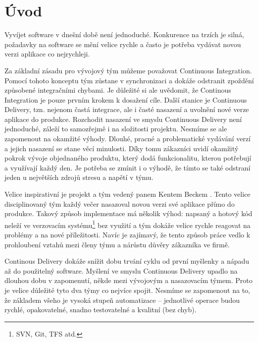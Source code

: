 
\chapter{Úvod}
Vyvíjet software v dnešní době není jednoduché. Konkurence na trzích je silná, požadavky na software se mění velice rychle a často je potřeba vydávat novou verzi aplikace co nejrychleji.

Za základní zásadu pro vývojový tým můžeme považovat Continuous Integration. Pomocí tohoto konceptu tým zůstane v synchronizaci a dokáže odstranit zpoždění způsobené integračními chybami. Je důležité si ale uvědomit, že Continous Integration je pouze prvním krokem k dosažení cíle. Další stanice je Continuous Delivery, tzn. nejenom častá integrace, ale i časté nasazení a uvolnění nové verze aplikace do produkce. Rozchodit nasazení ve smyslu Continuous Delivery není jednoduché, záleží to samozřejmě i na složitosti projektu. Nesmíme se ale zapomenout na okamžité výhody. Dlouhé, pracné a problematické vydávání verzí a jejich nasazení se stane věcí minulosti. Díky tomu zákazníci uvidí okamžitý pokrok vývoje objednaného produktu, který dodá funkcionalitu, kterou potřebují a využívají každý den. Je potřeba se zmínit i o výhodě, že tímto se také odstraní jeden u největších zdrojů stresu a napětí v týmu.

Velice inspirativní je projekt a tým vedený panem Kentem Beckem \cite{ContDelivery}. Tento velice disciplinovaný tým každý večer nasazoval novou verzi své aplikace přímo do produkce. Takový způsob implementace má několik výhod: napsaný a hotový kód neleží ve verzovacím systému\footnote{SVN, Git, TFS atd.} bez využití a tým dokáže velice rychle reagovat na problémy a na nové příležitosti. Navíc je zajímavý, že tento způsob práce vedlo k prohloubení vztahů mezi členy týmu a nárůstu důvěry zákazníka ve firmě. 

Continous Delivery dokáže snížit dobu trvání cyklu od první myšlenky a nápadu až do použitelný software. Myšlení ve smyslu Continuous Delivery upadlo na dlouhou dobu v zapomenutí, někde mezi vývojovým a nasazovacím týmem. Proto je velice důležité tyto dva týmy co nejvíce spojit. Nesmíme se zapomenout na to, že základem všeho je vysoká stupeň automatizace -- jednotlivé operace budou rychlé, opakovatelné, snadno testovatelné a kvalitní (bez chyb).

